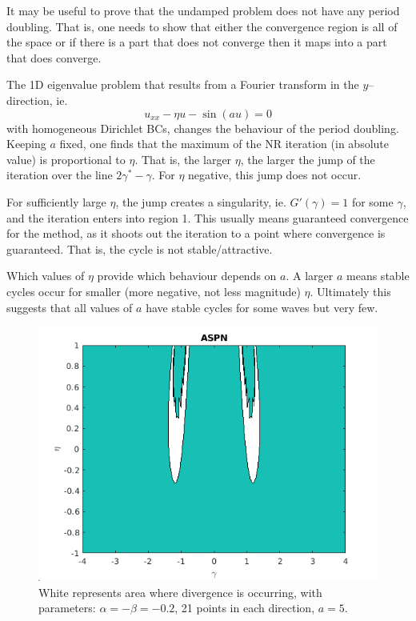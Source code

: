 \documentclass{article}
\begin{document}
It may be useful to prove that the undamped problem does not have any period doubling.
That is, one needs to show that either the convergence region is all of the space or if there is a part that does not converge then it maps into a part that does converge.

The 1D eigenvalue problem that results from a Fourier transform in the $y$--direction, ie.
\begin{equation*}
u_{xx} - \eta u - \sin(au) = 0
\end{equation*}
with homogeneous Dirichlet BCs, changes the behaviour of the period doubling.
Keeping $a$ fixed, one finds that the maximum of the NR iteration (in absolute value) is proportional to $\eta$.
That is, the larger $\eta$, the larger the jump of the iteration over the line $2\gamma^* - \gamma$.
For $\eta$ negative, this jump does not occur.

For sufficiently large $\eta$, the jump creates a singularity, ie. $G'(\gamma) = 1$ for some $\gamma$, and the iteration enters into region 1.
This usually means guaranteed convergence for the method, as it shoots out the iteration to a point where convergence is guaranteed.
That is, the cycle is not stable/attractive.

Which values of $\eta$ provide which behaviour depends on $a$.
A larger $a$ means stable cycles occur for smaller (more negative, not less magnitude) $\eta$.
Ultimately this suggests that all values of $a$ have stable cycles for some waves but very few.

\begin{figure}
\includegraphics[width=\textwidth]{exp17_01.png}
\caption{White represents area where divergence is occurring, with parameters: $\alpha = -\beta = -0.2$, 21 points in each direction, $a = 5$.}
\label{fig:exp17_01}
\end{figure}
\end{document}
